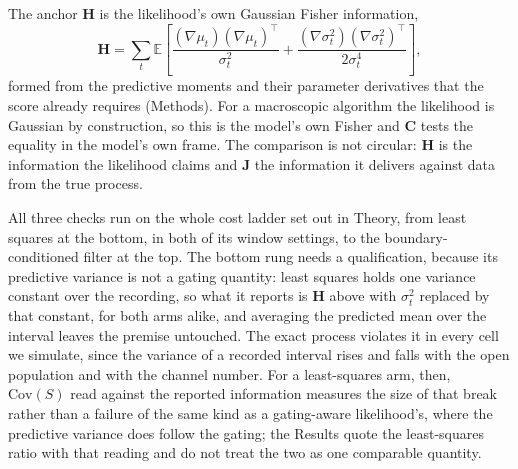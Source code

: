 The anchor $\mathbf{H}$ is the likelihood's own Gaussian Fisher information,
\begin{equation}
  \mathbf{H}=\sum_t\mathbb{E}\!\left[
    \frac{(\nabla\mu_t)(\nabla\mu_t)^\top}{\sigma_t^2}
    +\frac{(\nabla\sigma_t^2)(\nabla\sigma_t^2)^\top}{2\sigma_t^4}\right],
  \label{eq:gaussian-fisher}
\end{equation}
formed from the predictive moments and their parameter derivatives that the score already requires (Methods). For a macroscopic algorithm the likelihood is Gaussian by construction, so this is the model's own Fisher and $\mathbf{C}$ tests the equality in the model's own frame. The comparison is not circular: $\mathbf{H}$ is the information the likelihood claims and $\mathbf{J}$ the information it delivers against data from the true process.

All three checks run on the whole cost ladder set out in Theory, from least squares at the bottom, in both of its window settings, to the boundary-conditioned filter at the top. The bottom rung needs a qualification, because its predictive variance is not a gating quantity: least squares holds one variance constant over the recording, so what it reports is $\mathbf{H}$ above with $\sigma_t^2$ replaced by that constant, for both arms alike, and averaging the predicted mean over the interval leaves the premise untouched. The exact process violates it in every cell we simulate, since the variance of a recorded interval rises and falls with the open population and with the channel number. For a least-squares arm, then, $\mathrm{Cov}(S)$ read against the reported information measures the size of that break rather than a failure of the same kind as a gating-aware likelihood's, where the predictive variance does follow the gating; the Results quote the least-squares ratio with that reading and do not treat the two as one comparable quantity.

